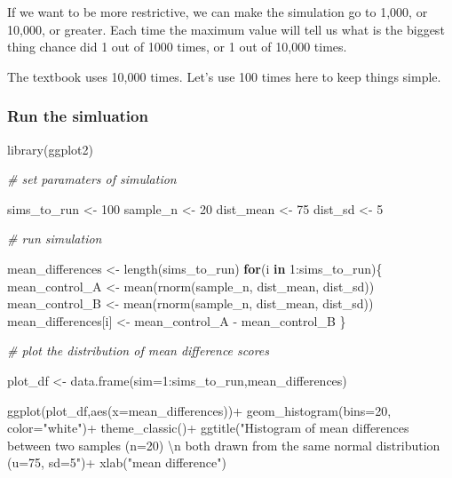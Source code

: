 \documentclass[
]{book}
\newenvironment{Shaded}{\begin{snugshade}}{\end{snugshade}}
\newcommand{\AttributeTok}[1]{\textcolor[rgb]{0.77,0.63,0.00}{#1}}
\newcommand{\CommentTok}[1]{\textcolor[rgb]{0.56,0.35,0.01}{\textit{#1}}}
\newcommand{\ControlFlowTok}[1]{\textcolor[rgb]{0.13,0.29,0.53}{\textbf{#1}}}
\newcommand{\DecValTok}[1]{\textcolor[rgb]{0.00,0.00,0.81}{#1}}
\newcommand{\FunctionTok}[1]{\textcolor[rgb]{0.00,0.00,0.00}{#1}}
\newcommand{\NormalTok}[1]{#1}
\newcommand{\OtherTok}[1]{\textcolor[rgb]{0.56,0.35,0.01}{#1}}
\newcommand{\SpecialCharTok}[1]{\textcolor[rgb]{0.00,0.00,0.00}{#1}}
\newcommand{\StringTok}[1]{\textcolor[rgb]{0.31,0.60,0.02}{#1}}
\begin{document}
If we want to be more restrictive, we can make the simulation go to 1,000, or 10,000, or greater. Each time the maximum value will tell us what is the biggest thing chance did 1 out of 1000 times, or 1 out of 10,000 times.

The textbook uses 10,000 times. Let's use 100 times here to keep things simple.

\hypertarget{run-the-simluation}{%
\subsubsection{Run the simluation}\label{run-the-simluation}}

\begin{Shaded}
\begin{Highlighting}[]
\FunctionTok{library}\NormalTok{(ggplot2)}

\CommentTok{\# set paramaters of simulation}

\NormalTok{sims\_to\_run }\OtherTok{\textless{}{-}} \DecValTok{100}
\NormalTok{sample\_n   }\OtherTok{\textless{}{-}} \DecValTok{20}
\NormalTok{dist\_mean  }\OtherTok{\textless{}{-}} \DecValTok{75}
\NormalTok{dist\_sd    }\OtherTok{\textless{}{-}} \DecValTok{5}

\CommentTok{\# run simulation}

\NormalTok{mean\_differences }\OtherTok{\textless{}{-}} \FunctionTok{length}\NormalTok{(sims\_to\_run)}
\ControlFlowTok{for}\NormalTok{(i }\ControlFlowTok{in} \DecValTok{1}\SpecialCharTok{:}\NormalTok{sims\_to\_run)\{}
\NormalTok{  mean\_control\_A      }\OtherTok{\textless{}{-}} \FunctionTok{mean}\NormalTok{(}\FunctionTok{rnorm}\NormalTok{(sample\_n, dist\_mean, dist\_sd))}
\NormalTok{  mean\_control\_B      }\OtherTok{\textless{}{-}} \FunctionTok{mean}\NormalTok{(}\FunctionTok{rnorm}\NormalTok{(sample\_n, dist\_mean, dist\_sd))}
\NormalTok{  mean\_differences[i] }\OtherTok{\textless{}{-}}\NormalTok{ mean\_control\_A }\SpecialCharTok{{-}}\NormalTok{ mean\_control\_B}
\NormalTok{\}}

\CommentTok{\# plot the  distribution of mean difference scores}

\NormalTok{plot\_df }\OtherTok{\textless{}{-}} \FunctionTok{data.frame}\NormalTok{(}\AttributeTok{sim=}\DecValTok{1}\SpecialCharTok{:}\NormalTok{sims\_to\_run,mean\_differences)}

\FunctionTok{ggplot}\NormalTok{(plot\_df,}\FunctionTok{aes}\NormalTok{(}\AttributeTok{x=}\NormalTok{mean\_differences))}\SpecialCharTok{+}
  \FunctionTok{geom\_histogram}\NormalTok{(}\AttributeTok{bins=}\DecValTok{20}\NormalTok{, }\AttributeTok{color=}\StringTok{"white"}\NormalTok{)}\SpecialCharTok{+}
  \FunctionTok{theme\_classic}\NormalTok{()}\SpecialCharTok{+}
  \FunctionTok{ggtitle}\NormalTok{(}\StringTok{"Histogram of mean differences between two samples (n=20) }\SpecialCharTok{\textbackslash{}n}
\StringTok{          both drawn from the same normal distribution (u=75, sd=5"}\NormalTok{)}\SpecialCharTok{+}
  \FunctionTok{xlab}\NormalTok{(}\StringTok{"mean difference"}\NormalTok{)}
\end{Highlighting}
\end{Shaded}
\end{document}

